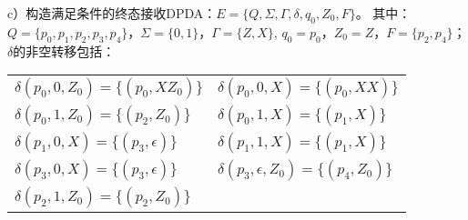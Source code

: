 \begin{solution}
c）构造满足条件的终态接收DPDA：$E=\{Q,\Sigma,\Gamma,\delta,q_0,Z_0,F\}$。
其中：$Q=\{p_0,p_1,p_2,p_3,p_4\}$，$\Sigma=\{0,1\}$，$\Gamma=\{Z,X\}$,
$q_0=p_0$，$Z_0=Z$，$F=\{p_2,p_4\}$；\\
$\delta$的非空转移包括：
\begin{tabular}{ll}
    $\delta(p_0,0,Z_0) = \{(p_0,XZ_0)\}$
    &$\delta(p_0,0,X) = \{(p_0,XX)\}$\\
    $\delta(p_0,1,Z_0) = \{(p_2,Z_0)\}$
    &$\delta(p_0,1,X) = \{(p_1,X)\}$\\
    $\delta(p_1,0,X) = \{(p_3,\epsilon)\}$
    &$\delta(p_1,1,X) = \{(p_1,X)\}$\\
    $\delta(p_3,0,X) = \{(p_3,\epsilon)\}$
    &$\delta(p_3,\epsilon,Z_0) = \{(p_4,Z_0)\}$\\
    $\delta(p_2,1,Z_0) = \{(p_2,Z_0)\}$
\end{tabular}
\end{solution}